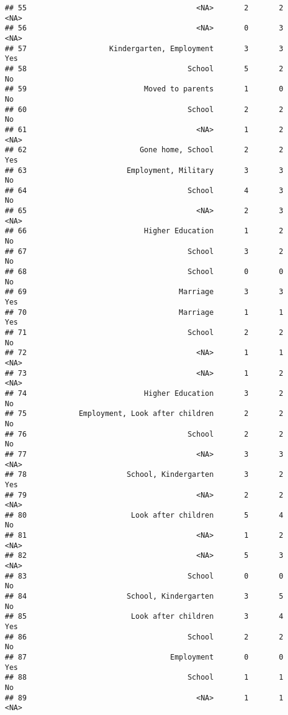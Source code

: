 \documentclass[
]{article}
\begin{document}
\begin{verbatim}
## 55                                       <NA>       2       2       <NA>
## 56                                       <NA>       0       3       <NA>
## 57                   Kindergarten, Employment       3       3        Yes
## 58                                     School       5       2         No
## 59                           Moved to parents       1       0         No
## 60                                     School       2       2         No
## 61                                       <NA>       1       2       <NA>
## 62                          Gone home, School       2       2        Yes
## 63                       Employment, Military       3       3         No
## 64                                     School       4       3         No
## 65                                       <NA>       2       3       <NA>
## 66                           Higher Education       1       2         No
## 67                                     School       3       2         No
## 68                                     School       0       0         No
## 69                                   Marriage       3       3        Yes
## 70                                   Marriage       1       1        Yes
## 71                                     School       2       2         No
## 72                                       <NA>       1       1       <NA>
## 73                                       <NA>       1       2       <NA>
## 74                           Higher Education       3       2         No
## 75            Employment, Look after children       2       2         No
## 76                                     School       2       2         No
## 77                                       <NA>       3       3       <NA>
## 78                       School, Kindergarten       3       2        Yes
## 79                                       <NA>       2       2       <NA>
## 80                        Look after children       5       4         No
## 81                                       <NA>       1       2       <NA>
## 82                                       <NA>       5       3       <NA>
## 83                                     School       0       0         No
## 84                       School, Kindergarten       3       5         No
## 85                        Look after children       3       4        Yes
## 86                                     School       2       2         No
## 87                                 Employment       0       0        Yes
## 88                                     School       1       1         No
## 89                                       <NA>       1       1       <NA>

\end{verbatim}
\end{document}
